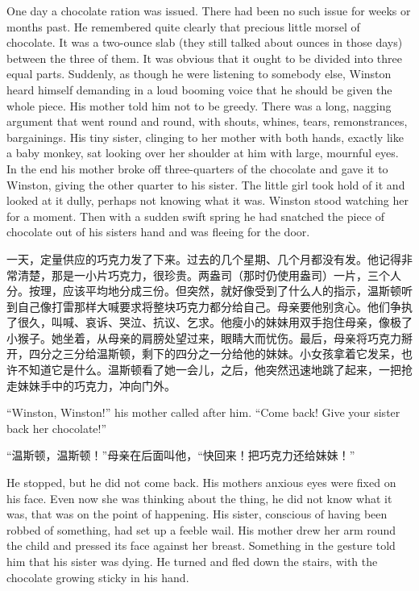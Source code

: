 \begin{paracol}{2}
\switchcolumn*

One day a chocolate ration was issued. There had been no such issue for
weeks or months past. He remembered quite clearly that precious little
morsel of chocolate. It was a two-ounce slab (they still talked about
ounces in those days) between the three of them. It was obvious that it
ought to be divided into three equal parts. Suddenly, as though he were
listening to somebody else, Winston heard himself demanding in a loud
booming voice that he should be given the whole piece. His mother told
him not to be greedy. There was a long, nagging argument that went round
and round, with shouts, whines, tears, remonstrances, bargainings. His
tiny sister, clinging to her mother with both hands, exactly like a baby
monkey, sat looking over her shoulder at him with large, mournful eyes.
In the end his mother broke off three-quarters of the chocolate and gave
it to Winston, giving the other quarter to his sister. The little girl
took hold of it and looked at it dully, perhaps not knowing what it was.
Winston stood watching her for a moment. Then with a sudden swift spring
he had snatched the piece of chocolate out of his
sister\textquotesingle s hand and was fleeing for the door.

\switchcolumn

一天，定量供应的巧克力发了下来。过去的几个星期、几个月都没有发。他记得非常清楚，那是一小片巧克力，很珍贵。两盎司（那时仍使用盎司）一片，三个人分。按理，应该平均地分成三份。但突然，就好像受到了什么人的指示，温斯顿听到自己像打雷那样大喊要求将整块巧克力都分给自己。母亲要他别贪心。他们争执了很久，叫喊、哀诉、哭泣、抗议、乞求。他瘦小的妹妹用双手抱住母亲，像极了小猴子。她坐着，从母亲的肩膀处望过来，眼睛大而忧伤。最后，母亲将巧克力掰开，四分之三分给温斯顿，剩下的四分之一分给他的妹妹。小女孩拿着它发呆，也许不知道它是什么。温斯顿看了她一会儿，之后，他突然迅速地跳了起来，一把抢走妹妹手中的巧克力，冲向门外。

\switchcolumn*

``Winston, Winston!'' his mother called after him. ``Come back! Give your
sister back her chocolate!''

\switchcolumn

``温斯顿，温斯顿！''母亲在后面叫他，``快回来！把巧克力还给妹妹！''

\switchcolumn*

He stopped, but he did not come back. His mother\textquotesingle s
anxious eyes were fixed on his face. Even now she was thinking about the
thing, he did not know what it was, that was on the point of happening.
His sister, conscious of having been robbed of something, had set up a
feeble wail. His mother drew her arm round the child and pressed its
face against her breast. Something in the gesture told him that his
sister was dying. He turned and fled down the stairs, with the chocolate
growing sticky in his hand.


\end{paracol}
